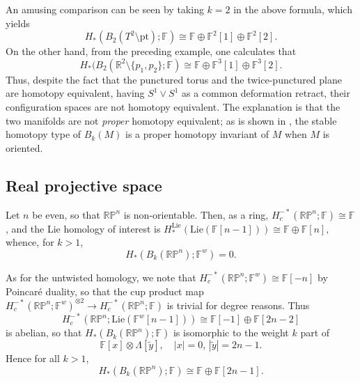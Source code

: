 \documentclass{compositio}
\theoremstyle{definition}\newtheorem{definition}{Definition}[section]
\theoremstyle{theorem}\newtheorem{lemma}[definition]{Lemma}
\theoremstyle{remark}\newtheorem*{conventions}{Conventions}
\theoremstyle{remark}\newtheorem*{acknowledgments}{Acknowledgments}
\theoremstyle{remark}\newtheorem*{outline}{Outline}
\theoremstyle{remark}\newtheorem*{questions}{Questions}
\theoremstyle{remark}\newtheorem{example}[definition]{Example}
\theoremstyle{definition}\newtheorem{construction}[definition]{Construction}
\theoremstyle{definition}\newtheorem*{convention}{Convention}
\theoremstyle{definition}\newtheorem*{conjecture}{Conjecture}
\theoremstyle{theorem}\newtheorem{theorem}[definition]{Theorem}
\theoremstyle{theorem}\newtheorem{paradigm}[definition]{Paradigm}
\theoremstyle{remark}\newtheorem{remark}[definition]{Remark}
\theoremstyle{corollary}\newtheorem{corollary}[definition]{Corollary}
\theoremstyle{theorem}\newtheorem{proposition}[definition]{Proposition}
\theoremstyle{definition}\newtheorem{question}[definition]{Question}
\begin{document}
An amusing comparison can be seen by taking $k=2$ in the above formula, which yields $$H_*(B_2(T^2\setminus \mathrm{pt});\mathbb{F})\cong \mathbb{F}\oplus\mathbb{F}^2[1]\oplus\mathbb{F}^2[2].$$ On the other hand, from the preceding example, one calculates that $$H_*(B_2(\mathbb{R}^2\setminus \{p_1,p_2\};\mathbb{F})\cong \mathbb{F}\oplus\mathbb{F}^3[1]\oplus\mathbb{F}^3[2].$$ Thus, despite the fact that the punctured torus and the twice-punctured plane are homotopy equivalent, having $S^1\vee S^1$ as a common deformation retract, their configuration spaces are not homotopy equivalent. The explanation is that the two manifolds are not \emph{proper} homotopy equivalent; as is shown in \cite{Francis}, the stable homotopy type of $B_k(M)$ is a proper homotopy invariant of $M$ when $M$ is oriented.

\subsection{Real projective space}
Let $n$ be even, so that $\mathbb{RP}^n$ is non-orientable. Then, as a ring, $H_c^{-*}(\mathbb{RP}^n;\mathbb{F})\cong\mathbb{F}$, and the Lie homology of interest is $H_*^{\mathrm{Lie}}({\mathrm{Lie}}(\mathbb{F}[n-1]))\cong\mathbb{F}\oplus \mathbb{F}[n],$ whence, for $k>1$, $$H_*(B_k(\mathbb{RP}^n);\mathbb{F}^w)=0.$$

As for the untwisted homology, we note that $H_c^{-*}(\mathbb{RP}^n;\mathbb{F}^w)\cong \mathbb{F}[-n]$ by Poincar\'{e} duality, so that the cup product map $H_c^{-*}(\mathbb{RP}^n;\mathbb{F}^w)^{\otimes 2}\to H_c^{-*}(\mathbb{RP}^n;\mathbb{F})$ is trivial for degree reasons. Thus $$H_c^{-*}(\mathbb{RP}^n; {\mathrm{Lie}}(\mathbb{F}^w[n-1]))\cong \mathbb{F}[-1] \oplus \mathbb{F}[2n-2]$$ is abelian, so that $H_*(B_k(\mathbb{RP}^n);\mathbb{F})$ is isomorphic to the weight $k$ part of $$\mathbb{F}[x]\otimes \Lambda[\tilde y],\quad |x|=0,\, |\tilde y|=2n-1.$$ Hence for all $k>1$, $$H_*(B_k(\mathbb{RP}^n);\mathbb{F})\cong\mathbb{F}\oplus\mathbb{F}[2n-1].$$
\end{document}
